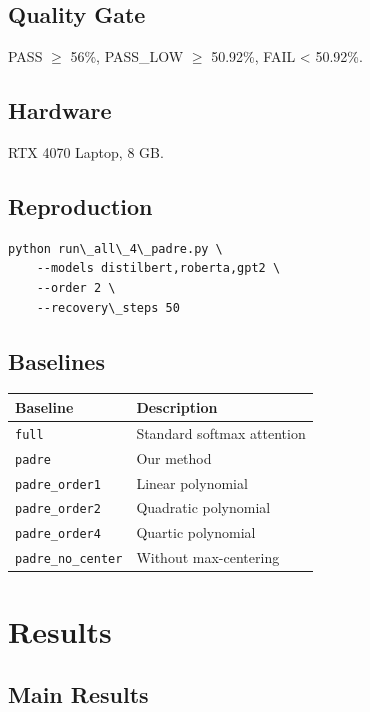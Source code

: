 \subsection{Quality Gate}

PASS $\ge$ 56\%, PASS\_LOW $\ge$ 50.92\%, FAIL \textless{} 50.92\%.

\subsection{Hardware}

RTX 4070 Laptop, 8 GB.

\subsection{Reproduction}

\begin{lstlisting}
python run\_all\_4\_padre.py \
    --models distilbert,roberta,gpt2 \
    --order 2 \
    --recovery\_steps 50
\end{lstlisting}

\subsection{Baselines}

\begin{table}[H]
\centering
\small
\begin{tabular}{ll}
\toprule
\textbf{Baseline} & \textbf{Description} \\
\midrule
\texttt{full} & Standard softmax attention \\
\texttt{padre} & Our method \\
\texttt{padre\_order1} & Linear polynomial \\
\texttt{padre\_order2} & Quadratic polynomial \\
\texttt{padre\_order4} & Quartic polynomial \\
\texttt{padre\_no\_center} & Without max-centering \\
\bottomrule
\end{tabular}
\end{table}



\section{Results}

\subsection{Main Results}

